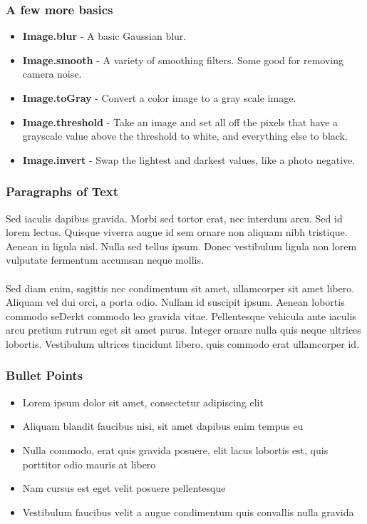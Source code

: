 \documentclass{beamer}
\begin{document}
\begin{frame}
\frametitle{A few more basics}
\begin{itemize}
  \item \textbf{Image.blur} - A basic Gaussian blur. 
  \item \textbf{Image.smooth} - A variety of smoothing filters. Some
    good for removing camera noise. 
  \item \textbf{Image.toGray} - Convert a color image to a gray scale
    image.
  \item \textbf{Image.threshold} - Take an image and set all off the
    pixels that have a grayscale value above the threshold to white,
    and everything else to black.
 \item \textbf{Image.invert} - Swap the lightest and darkest values,
   like a photo negative. 
\end{itemize}
\end{frame}

\begin{frame}
  \frametitle{Paragraphs of Text}
  Sed iaculis dapibus gravida. Morbi sed tortor erat, nec interdum arcu. Sed id lorem lectus. Quisque viverra augue id sem ornare non aliquam nibh tristique. Aenean in ligula nisl. Nulla sed tellus ipsum. Donec vestibulum ligula non lorem vulputate fermentum accumsan neque mollis.\\~\\

  Sed diam enim, sagittis nec condimentum sit amet, ullamcorper sit
  amet libero. Aliquam vel dui orci, a porta odio. Nullam id suscipit
  ipsum. Aenean lobortis commodo seDerkt commodo leo gravida
  vitae. Pellentesque vehicula ante iaculis arcu pretium rutrum eget
  sit amet purus. Integer ornare nulla quis neque ultrices
  lobortis. Vestibulum ultrices tincidunt libero, quis commodo erat
  ullamcorper id.
\end{frame}


\begin{frame}
  \frametitle{Bullet Points}
  \begin{itemize}
  \item Lorem ipsum dolor sit amet, consectetur adipiscing elit
  \item Aliquam blandit faucibus nisi, sit amet dapibus enim tempus eu
  \item Nulla commodo, erat quis gravida posuere, elit lacus lobortis
    est, quis porttitor odio mauris at libero
  \item Nam cursus est eget velit posuere pellentesque
  \item Vestibulum faucibus velit a augue condimentum quis convallis
    nulla gravida
  \end{itemize}
\end{frame}
\end{document}
